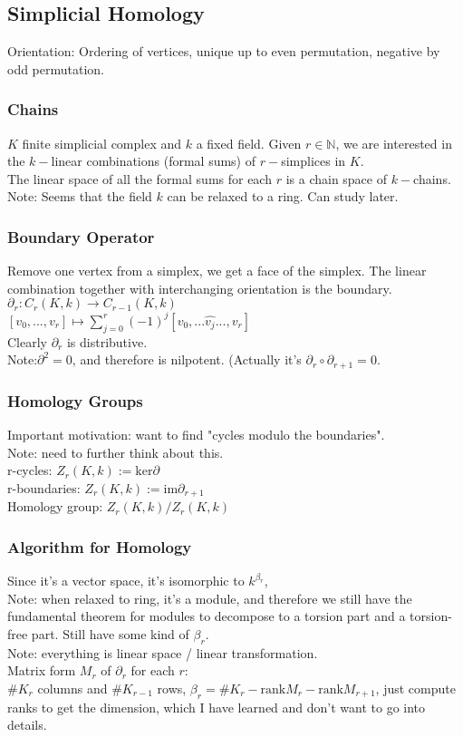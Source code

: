 \documentclass[10pt,a4paper]{article}
\begin{document}
\subsection{Simplicial Homology}
Orientation: Ordering of vertices, unique up to even permutation, negative by odd permutation.
\subsubsection{Chains}
$K$ finite simplicial complex and $k$ a fixed field. Given $r\in\mathbb{N}$, we are interested in the $k-$linear combinations (formal sums) of $r-$simplices in $K$.\\
The linear space of all the formal sums for each $r$ is a chain space of $k-$chains.\\
Note: Seems that the field $k$ can be relaxed to a ring. Can study later.\\
\subsubsection{Boundary Operator}
Remove one vertex from a simplex, we get a face of the simplex. The linear combination together with interchanging orientation is the boundary.\\
$\partial_r:C_r(K,k)\to C_{r-1}(K,k)$\\
$[v_0,...,v_r]\mapsto\sum_{j=0}^{r}(-1)^{j}[v_0,...\hat{v_j}...,v_r]$\\
Clearly $\partial_r$ is distributive.\\
Note:$\partial^2=0$, and therefore is nilpotent. (Actually it's $\partial_r\circ\partial_{r+1}=0$.
\subsubsection{Homology Groups}
Important motivation: want to find "cycles modulo the boundaries".\\
Note: need to further think about this.\\
r-cycles: $Z_r(K,k):=\text{ker}\partial$\\
r-boundaries: $Z_r(K,k):=\text{im}\partial_{r+1}$\\
Homology group: $Z_r(K,k)/Z_r(K,k)$\\
\subsubsection{Algorithm for Homology}
Since it's a vector space, it's isomorphic to $k^{\beta_r}$,\\
Note: when relaxed to ring, it's a module, and therefore we still have the fundamental theorem for modules to decompose to a torsion part and a torsion-free part. Still have some kind of $\beta_r$.\\
Note: everything is linear space / linear transformation.\\
Matrix form $M_r$ of $\partial_r$ for each $r$:\\
$\#K_r$ columns and $\#K_{r-1}$ rows, $\beta_r=\#K_r-\text{rank}M_r-\text{rank}M_{r+1}$, just compute ranks to get the dimension, which I have learned and don't want to go into details.\\
\end{document}
